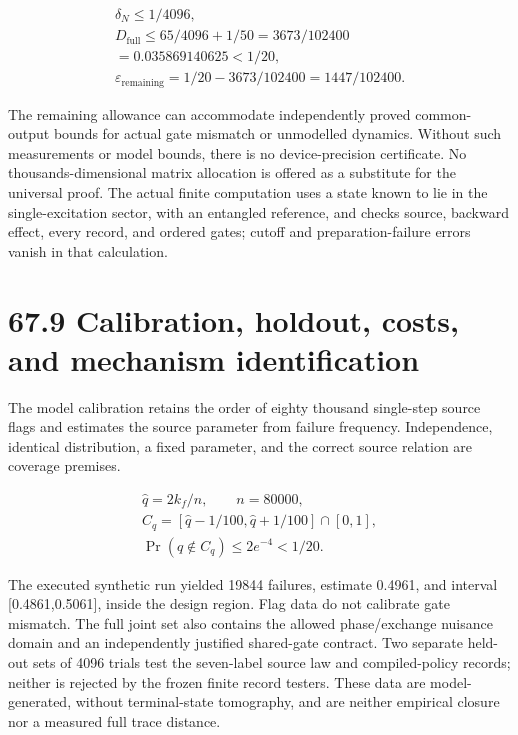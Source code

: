 \documentclass[
  11pt,
  oneside]{book}
\begin{document}
\[
\begin{gathered}
\delta_N\le1/4096,\\
D_{\mathrm{full}}\le65/4096+1/50
=3673/102400\\
=0.035869140625<1/20,\\
\varepsilon_{\mathrm{remaining}}=1/20-3673/102400=1447/102400.
\end{gathered}
\]

The remaining allowance can accommodate independently proved
common-output bounds for actual gate mismatch or unmodelled dynamics.
Without such measurements or model bounds, there is no device-precision
certificate. No thousands-dimensional matrix allocation is offered as a
substitute for the universal proof. The actual finite computation uses a
state known to lie in the single-excitation sector, with an entangled
reference, and checks source, backward effect, every record, and ordered
gates; cutoff and preparation-failure errors vanish in that calculation.

\section{67.9 Calibration, holdout, costs, and mechanism identification}

The model calibration retains the order of eighty thousand single-step
source flags and estimates the source parameter from failure frequency.
Independence, identical distribution, a fixed parameter, and the correct
source relation are coverage premises.

\[
\begin{gathered}
\widehat q=2k_f/n,\qquad n=80000,\\
C_q=[\widehat q-1/100,\widehat q+1/100]\cap[0,1],\\
\Pr(q\notin C_q)\le2e^{-4}<1/20.
\end{gathered}
\]

The executed synthetic run yielded 19844 failures, estimate 0.4961, and
interval {[}0.4861,0.5061{]}, inside the design region. Flag data do not
calibrate gate mismatch. The full joint set also contains the allowed
phase/exchange nuisance domain and an independently justified
shared-gate contract. Two separate held-out sets of 4096 trials test the
seven-label source law and compiled-policy records; neither is rejected
by the frozen finite record testers. These data are model-generated,
without terminal-state tomography, and are neither empirical closure nor
a measured full trace distance.
\end{document}
